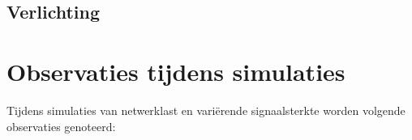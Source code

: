 \subsection{Verlichting}

\section{Observaties tijdens simulaties}

Tijdens simulaties van netwerklast en variërende signaalsterkte worden volgende observaties genoteerd:




